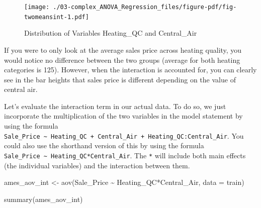 \documentclass[
  letterpaper,
  DIV=11,
  numbers=noendperiod]{scrreprt}
\newenvironment{Shaded}{\begin{snugshade}}{\end{snugshade}}
\newcommand{\AttributeTok}[1]{\textcolor[rgb]{0.40,0.45,0.13}{#1}}
\newcommand{\FunctionTok}[1]{\textcolor[rgb]{0.28,0.35,0.67}{#1}}
\newcommand{\NormalTok}[1]{\textcolor[rgb]{0.00,0.23,0.31}{#1}}
\newcommand{\OtherTok}[1]{\textcolor[rgb]{0.00,0.23,0.31}{#1}}
\newcommand{\SpecialCharTok}[1]{\textcolor[rgb]{0.37,0.37,0.37}{#1}}
\newcommand{\StringTok}[1]{\textcolor[rgb]{0.13,0.47,0.30}{#1}}
\begin{document}
\begin{Shaded}
\end{Shaded}

\begin{figure}[H]

{\centering \texttt{[image: ./03-complex\_ANOVA\_Regression\_files/figure-pdf/fig-twomeansint-1.pdf]}

}

\caption{\label{fig-twomeansint}Distribution of Variables Heating\_QC
and Central\_Air}

\end{figure}

If you were to only look at the average sales price across heating
quality, you would notice no difference between the two groups (average
for both heating categories is 125). However, when the interaction is
accounted for, you can clearly see in the bar heights that sales price
is different depending on the value of central air.

Let's evaluate the interaction term in our actual data. To do so, we
just incorporate the multiplication of the two variables in the model
statement by using the formula
\texttt{Sale\_Price\ \textasciitilde{}\ Heating\_QC\ +\ Central\_Air\ +\ Heating\_QC:Central\_Air}.
You could also use the shorthand version of this by using the formula
\texttt{Sale\_Price\ \textasciitilde{}\ Heating\_QC*Central\_Air}. The
\texttt{*} will include both main effects (the individual variables) and
the interaction between them.

\begin{Shaded}
\begin{Highlighting}[]
\NormalTok{ames\_aov\_int }\OtherTok{\textless{}{-}} \FunctionTok{aov}\NormalTok{(Sale\_Price }\SpecialCharTok{\textasciitilde{}}\NormalTok{ Heating\_QC}\SpecialCharTok{*}\NormalTok{Central\_Air, }\AttributeTok{data =}\NormalTok{ train)}

\FunctionTok{summary}\NormalTok{(ames\_aov\_int)}
\end{Highlighting}
\end{Shaded}
\end{document}
